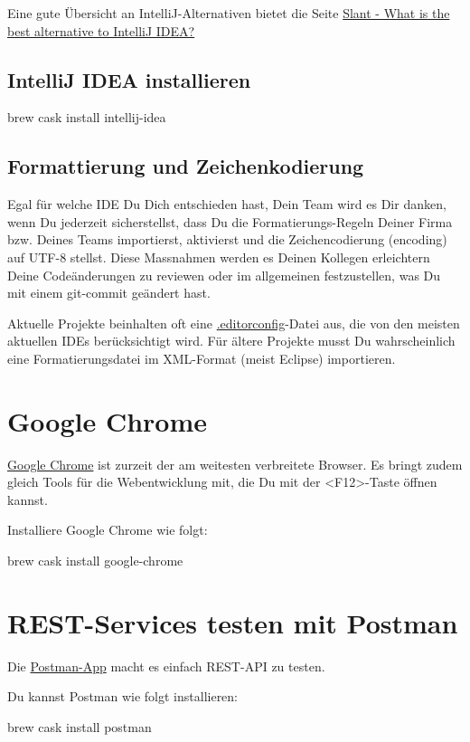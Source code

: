\documentclass[]{article}
\begin{document}
Eine gute Übersicht an IntelliJ-Alternativen bietet die Seite \href{https://www.slant.co/options/1958/alternatives/~intellij-idea-alternatives}{Slant - What is the best alternative to IntelliJ IDEA?}

\subsection{IntelliJ IDEA installieren}
\begin{bashcode}
brew cask install intellij-idea
\end{bashcode}

\subsection{Formattierung und Zeichenkodierung }
Egal für welche IDE Du Dich entschieden hast, Dein Team wird es Dir danken, wenn Du jederzeit sicherstellst, dass Du die Formatierungs-Regeln Deiner Firma bzw. Deines Teams importierst, aktivierst und die Zeichencodierung (encoding) auf UTF-8 stellst. Diese Massnahmen werden es Deinen Kollegen erleichtern Deine Codeänderungen zu reviewen oder im allgemeinen festzustellen, was Du mit einem git-commit geändert hast.

Aktuelle Projekte beinhalten oft eine \href{https://editorconfig.org/}{.editorconfig}-Datei aus, die von den meisten aktuellen IDEs berücksichtigt wird. Für ältere Projekte musst Du wahrscheinlich eine Formatierungsdatei im XML-Format (meist Eclipse) importieren.

\section{Google Chrome}
\href{https://www.google.com/chrome/}{Google Chrome} ist zurzeit der am weitesten verbreitete Browser. Es bringt zudem gleich Tools für die Webentwicklung mit, die Du mit der <F12>-Taste öffnen kannst.

Installiere Google Chrome wie folgt:
\begin{bashcode}
brew cask install google-chrome
\end{bashcode}


\section{REST-Services testen mit Postman}
Die \href{https://www.getpostman.com/products}{Postman-App} macht es einfach REST-API zu testen. 

Du kannst Postman wie folgt installieren:
\begin{bashcode}
brew cask install postman
\end{bashcode}
\end{document}
